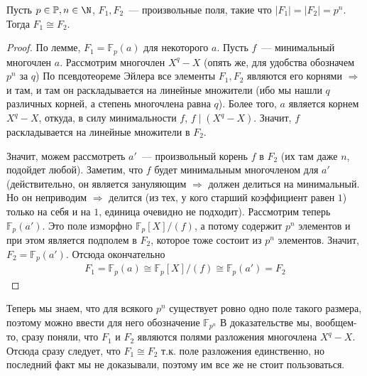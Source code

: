 \begin{theorem}
    Пусть $p\in \mathbb{P}, n\in \N$, $F_1, F_2$~--- произвольные поля, такие что $|F_1|=|F_2|=p^n$.
    Тогда $F_1\cong F_2$.
\end{theorem}
\begin{proof}
    По лемме, $F_1=\mathbb{F}_p(a)$ для некоторого $a$.
    Пусть $f$~--- минимальный многочлен $a$.
    Рассмотрим многочлен $X^q-X$ (опять же, для удобства обозначем $p^n$ за $q$)
    По псевдотеореме Эйлера все элементы $F_1, F_2$ являются его корнями $\Rightarrow$ и там, и там он раскладывается на линейные множители (ибо мы нашли $q$ различных корней, а степень многочлена равна $q$).
    Более того, $a$ является корнем $X^q-X$, откуда, в силу минимальности $f$, $f \mid (X^q-X)$.
    Значит, $f$ раскладывается на линейные множители в $F_2$.

    Значит, можем рассмотреть $a'$~--- произвольный корень $f$ в $F_2$ (их там даже $n$, подойдет любой).
    Заметим, что $f$ будет минимальным многочленом для $a'$ (действительно, он является зануляющим $\Rightarrow$ должен делиться на минимальный. Но он неприводим $\Rightarrow$ делится (из тех, у кого старший коэффициент равен $1$) только на себя и на $1$, единица очевидно не подходит).
    Рассмотрим теперь $\mathbb{F}_p(a')$.
    Это поле изморфно $\mathbb{F}_p[X] / (f)$, а потому содержит $p^n$ элементов и при этом является подполем в $F_2$, которое тоже состоит из $p^n$ элементов.
    Значит, $F_2 = \mathbb{F}_p(a')$.
    Отсюда окончательно
    \begin{gather*}
        F_1 = \mathbb{F}_p(a) \cong \mathbb{F}_p[X] / (f) \cong \mathbb{F}_p(a') = F_2
    \end{gather*}
\end{proof}

\notice Теперь мы знаем, что для всякого $p^n$ существует ровно одно поле такого размера, поэтому можно ввести для него обозначение $\mathbb{F}_{p^n}$
\notice В доказательстве мы, вообщем-то, сразу поняли, что $F_1$ и $F_2$ являются полями разложения многочлена $X^q-X$.
Отсюда сразу следует, что $F_1\cong F_2$ т.к. поле разложения единственно, но последний факт мы не доказывали, поэтому им все же не стоит пользоваться.

